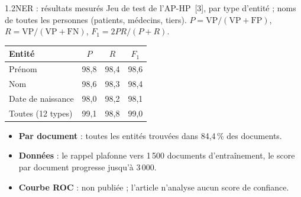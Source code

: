 \documentclass[11pt,aspectratio=169]{beamer}
\newcommand{\refs}[1]{{\color{mlblue}[#1]}}
\newcommand{\pct}[1]{#1\,\%}
\newcommand{\VP}{\mathrm{VP}}
\newcommand{\FP}{\mathrm{FP}}
\newcommand{\FN}{\mathrm{FN}}
\begin{document}
\begin{frame}{1.2\quad NER : résultats mesurés}
  \small
  Jeu de test de l'AP-HP~\refs{3}, par type d'entité ; noms de toutes les personnes
  (patients, médecins, tiers). $P = \VP / (\VP + \FP)$, $R = \VP / (\VP + \FN)$,
  $F_1 = 2PR / (P + R)$.

  \begin{center}
    \setlength{\tabcolsep}{9pt}
    \renewcommand{\arraystretch}{1.15}
    \begin{tabular}{@{}lccc@{}}
      \toprule
      \textbf{Entité} & $P$ & $R$ & $F_1$ \\
      \midrule
      Prénom            & 98,8 & 98,4 & 98,6 \\
      Nom               & 98,6 & 98,3 & 98,4 \\
      Date de naissance & 98,0 & 98,2 & 98,1 \\
      Toutes (12 types) & 99,1 & 98,8 & 99,0 \\
      \bottomrule
    \end{tabular}
  \end{center}

  \begin{itemize}\setlength{\itemsep}{1pt}
    \item \textbf{Par document} : toutes les entités trouvées dans \pct{84,4} des documents.
    \item \textbf{Données} : le rappel plafonne vers 1\,500 documents d'entraînement, le score
      par document progresse jusqu'à 3\,000.
    \item \textbf{Courbe ROC} : non publiée ; l'article n'analyse aucun score de confiance.
  \end{itemize}
\end{frame}
\end{document}
